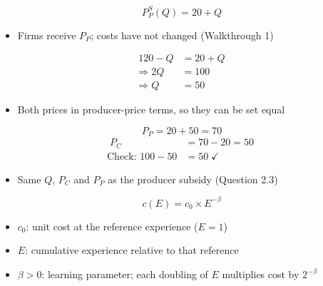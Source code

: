 \documentclass{beamer}
\begin{document}
\begin{frame}[plain,label=w3_cs_step4]
  \Large
  \[
    \tag{15}\;P_P^S(Q) = 20 + Q
  \]
  \vspace{0.3em}
  \begin{itemize}\Large
    \item Firms receive $P_P$; costs have not changed (Walkthrough 1)
  \end{itemize}
\end{frame}

\begin{frame}[plain,label=w3_cs_step5]
  \Large
  \begin{align*}
    \tag{16}\;120 - Q &= 20 + Q\\
    \Rightarrow 2Q &= 100\\
    \Rightarrow Q &= 50
  \end{align*}
  \vspace{0.2em}
  \begin{itemize}\Large
    \item Both prices in producer-price terms, so they can be set equal
  \end{itemize}
\end{frame}

\begin{frame}[plain,label=w3_cs_step6]
  \Large
  \[
    \tag{17}\;P_P = 20 + 50 = 70
  \]
  \begin{align*}
    \tag{18}\;P_C &= 70 - 20 = 50\\
    \text{Check: } 100 - 50 &= 50 \;\checkmark
  \end{align*}
  \vspace{0.2em}
  \begin{itemize}\Large
    \item Same $Q$, $P_C$ and $P_P$ as the producer subsidy (Question 2.3)
  \end{itemize}
\end{frame}

\begin{frame}[plain,label=w3_learning_curve]
  \Large
  \[
    \tag{19}\;c(E) = c_0 \times E^{-\beta}
  \]
  \vspace{0.3em}
  \begin{itemize}\Large
    \item $c_0$: unit cost at the reference experience ($E = 1$)
    \item $E$: cumulative experience relative to that reference
    \item $\beta > 0$: learning parameter; each doubling of $E$ multiplies cost by $2^{-\beta}$
  \end{itemize}
\end{frame}
\end{document}
